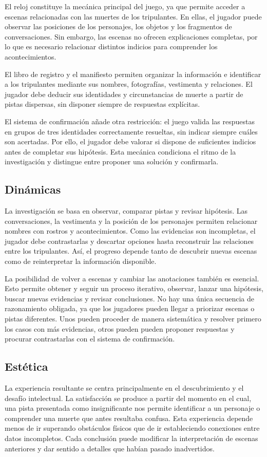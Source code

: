 \documentclass[12pt,a4paper]{article}
\begin{document}
El reloj constituye la mecánica principal del juego, ya que permite acceder a escenas relacionadas con las muertes de los tripulantes. En ellas, el jugador puede observar las posiciones de los personajes, los objetos y los fragmentos de conversaciones. Sin embargo, las escenas no ofrecen explicaciones completas, por lo que es necesario relacionar distintos indicios para comprender los acontecimientos.

El libro de registro y el manifiesto permiten organizar la información e identificar a los tripulantes mediante sus nombres, fotografías, vestimenta y relaciones. El jugador debe deducir sus identidades y circunstancias de muerte a partir de pistas dispersas, sin disponer siempre de respuestas explícitas.

El sistema de confirmación añade otra restricción: el juego valida las respuestas en grupos de tres identidades correctamente resueltas, sin indicar siempre cuáles son acertadas. Por ello, el jugador debe valorar si dispone de suficientes indicios antes de completar sus hipótesis. Esta mecánica condiciona el ritmo de la investigación y distingue entre proponer una solución y confirmarla.

\subsection{Dinámicas}
La investigación se basa en observar, comparar pistas y revisar hipótesis. Las conversaciones, la vestimenta y la posición de los personajes permiten relacionar nombres con rostros y acontecimientos. Como las evidencias son incompletas, el jugador debe contrastarlas y descartar opciones hasta reconstruir las relaciones entre los tripulantes. Así, el progreso depende tanto de descubrir nuevas escenas como de reinterpretar la información disponible.

La posibilidad de volver a escenas y cambiar las anotaciones también es esencial. Esto permite obtener y seguir un proceso iterativo, observar, lanzar una hipótesis, buscar nuevas evidencias y revisar conclusiones. No hay una única secuencia de razonamiento obligada, ya que los jugadores pueden llegar a priorizar escenas o pistas diferentes. Unos pueden proceder de manera sistemática y resolver primero los casos con más evidencias, otros pueden pueden proponer respuestas y procurar contrastarlas con el sistema de confirmación.

\subsection{Estética}
La experiencia resultante se centra principalmente en el descubrimiento y el desafío intelectual. La satisfacción se produce a partir del momento en el cual, una pista presentada como insignificante nos permite identificar a un personaje o comprender una muerte que antes resultaba confusa. Esta experiencia depende menos de ir superando obstáculos físicos que de ir estableciendo conexiones entre datos incompletos. Cada conclusión puede modificar la interpretación de escenas anteriores y dar sentido a detalles que habían pasado inadvertidos.
\end{document}

